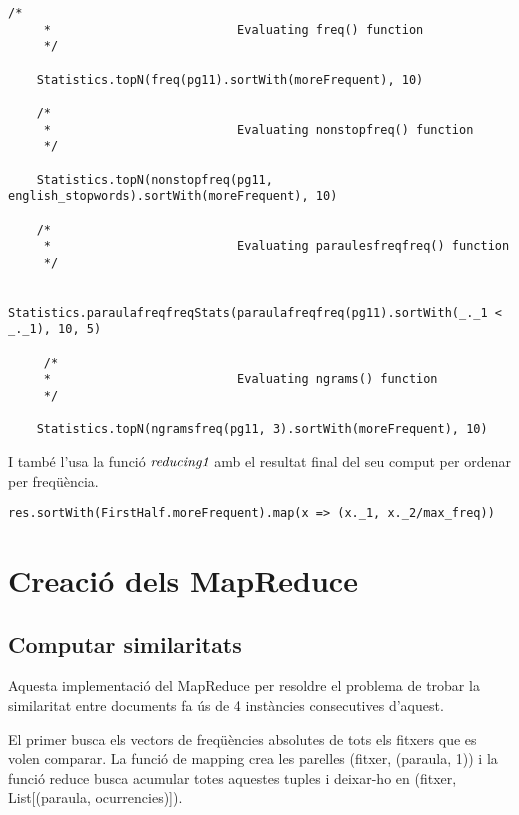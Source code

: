 \documentclass{report}
\begin{document}
\begin{lstlisting}[style=scalaHighlight]
/*
     * 							Evaluating freq() function
     */

    Statistics.topN(freq(pg11).sortWith(moreFrequent), 10)

    /*
     * 							Evaluating nonstopfreq() function
     */

    Statistics.topN(nonstopfreq(pg11, english_stopwords).sortWith(moreFrequent), 10)

    /*
     * 							Evaluating paraulesfreqfreq() function
     */

    Statistics.paraulafreqfreqStats(paraulafreqfreq(pg11).sortWith(_._1 < _._1), 10, 5)

     /*
     * 							Evaluating ngrams() function
     */

    Statistics.topN(ngramsfreq(pg11, 3).sortWith(moreFrequent), 10)
\end{lstlisting}

I també l'usa la funció $ \emph{reducing1} $ amb el resultat final del seu comput per ordenar per freqüència.

\begin{lstlisting}[style=scalaHighlight]
    res.sortWith(FirstHalf.moreFrequent).map(x => (x._1, x._2/max_freq))
\end{lstlisting}

\chapter{Creació dels MapReduce}

\section{Computar similaritats}

Aquesta implementació del MapReduce per resoldre el problema de trobar la similaritat entre documents fa ús de 4 instàncies consecutives d'aquest. 

El primer busca els vectors de freqüències absolutes de tots els fitxers que es volen comparar. La funció de mapping crea les parelles (fitxer, (paraula, 1)) i la funció reduce busca acumular totes aquestes tuples i deixar-ho en (fitxer, List[(paraula, ocurrencies)]).
\end{document}
